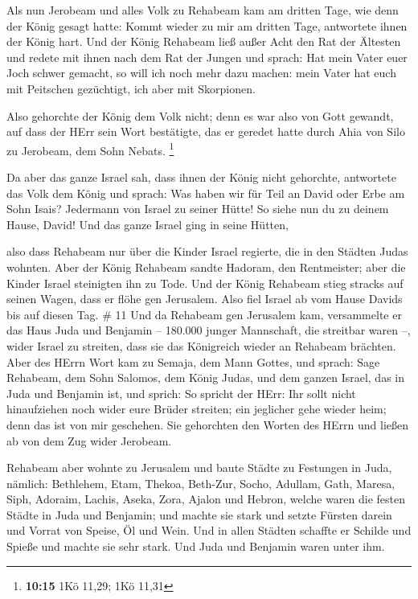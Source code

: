  Als nun Jerobeam und alles Volk zu Rehabeam kam am dritten
Tage, wie denn der König gesagt hatte: Kommt wieder zu mir am dritten
Tage,  antwortete ihnen der König hart. Und der König
Rehabeam ließ außer Acht den Rat der Ältesten  und redete
mit ihnen nach dem Rat der Jungen und sprach: Hat mein Vater euer Joch
schwer gemacht, so will ich noch mehr dazu machen: mein Vater hat euch
mit Peitschen gezüchtigt, ich aber mit Skorpionen.

 Also gehorchte der König dem Volk nicht; denn es war also
von Gott gewandt, auf dass der HErr sein Wort bestätigte, das er geredet
hatte durch Ahia von Silo zu Jerobeam, dem Sohn Nebats. \footnote{\textbf{10:15}
  1Kö 11,29; 1Kö 11,31}

 Da aber das ganze Israel sah, dass ihnen der König nicht
gehorchte, antwortete das Volk dem König und sprach: Was haben wir für
Teil an David oder Erbe am Sohn Isais? Jedermann von Israel zu seiner
Hütte! So siehe nun du zu deinem Hause, David! Und das ganze Israel ging
in seine Hütten,

 also dass Rehabeam nur über die Kinder Israel regierte,
die in den Städten Judas wohnten.  Aber der König Rehabeam
sandte Hadoram, den Rentmeister; aber die Kinder Israel steinigten ihn
zu Tode. Und der König Rehabeam stieg stracks auf seinen Wagen, dass er
flöhe gen Jerusalem.  Also fiel Israel ab vom Hause Davids
bis auf diesen Tag. \# 11  Und da Rehabeam gen Jerusalem
kam, versammelte er das Haus Juda und Benjamin -- 180.000 junger
Mannschaft, die streitbar waren --, wider Israel zu streiten, dass sie
das Königreich wieder an Rehabeam brächten.  Aber des HErrn
Wort kam zu Semaja, dem Mann Gottes, und sprach:  Sage
Rehabeam, dem Sohn Salomos, dem König Judas, und dem ganzen Israel, das
in Juda und Benjamin ist, und sprich:  So spricht der HErr:
Ihr sollt nicht hinaufziehen noch wider eure Brüder streiten; ein
jeglicher gehe wieder heim; denn das ist von mir geschehen. Sie
gehorchten den Worten des HErrn und ließen ab von dem Zug wider
Jerobeam.

 Rehabeam aber wohnte zu Jerusalem und baute Städte zu
Festungen in Juda,  nämlich: Bethlehem, Etam, Thekoa,
 Beth-Zur, Socho, Adullam,  Gath, Maresa, Siph,
 Adoraim, Lachis, Aseka,  Zora, Ajalon und
Hebron, welche waren die festen Städte in Juda und Benjamin;
 und machte sie stark und setzte Fürsten darein und Vorrat
von Speise, Öl und Wein.  Und in allen Städten schaffte er
Schilde und Spieße und machte sie sehr stark. Und Juda und Benjamin
waren unter ihm.

